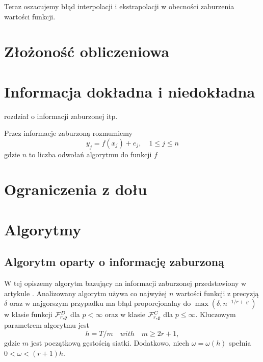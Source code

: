 \documentclass[oik, pdftex, robocza, man]{mgrwms}
\begin{document}
Teraz oszacujemy błąd interpolacji i ekstrapolacji w obecności zaburzenia wartości funkcji.

\mgrclosechapter


\chapter{Złożoność obliczeniowa}



\mgrclosechapter



\chapter{Informacja dokładna i niedokładna}

\noindent
rozdział o informacji zaburzonej itp.

Przez informacje zaburzoną rozmumiemy
\begin{equation*}
    y_j = f(x_j) + e_j, \quad 1 \leq j \leq n
\end{equation*}
gdzie $n$ to liczba odwołań algorytmu do funkcji $f$


\mgrclosechapter




\chapter{Ograniczenia z dołu}


\mgrclosechapter



\chapter{Algorytmy}


\section{Algorytm oparty o informację zaburzoną}

W tej opiszemy algorytm bazujący na informacji zaburzonej przedstawiony w artykule \cite{AoP}. Analizowany algorytm używa co najwyżej $n$ wartości funkcji z precyzją $\delta $ oraz w najgorszym przypadku ma błąd proporcjonalny do $\max{(\delta, n^{-1 / r + \varrho })}$ w klasie funkcji $\mathcal{F}^D_{r,\varrho }$ dla $p < \infty$ oraz w klasie $\mathcal{F}^C_{r,\varrho }$ dla $p \leq \infty$. Kluczowym parametrem algorytmu jest
$$
    h = T / m \quad with \quad  m \geq 2r + 1,
$$
gdzie $m$ jest początkową gęstością siatki. Dodatkowo, niech $\omega  = \omega(h)$ spełnia $0 < \omega < (r + 1)h $.
\end{document}
